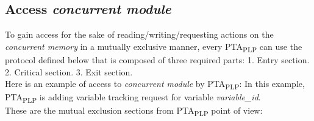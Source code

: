 \subsection{Access \textit{concurrent module}}
To gain access for the sake of reading/writing/requesting actions on the \textit{concurrent memory} in a mutually exclusive manner, every PTA\textsubscript{PLP} can use the protocol defined below that is composed of three required parts: 1. Entry section. 2. Critical section. 3. Exit section.\\
Here is an example of access to \textit{concurrent module} by PTA\textsubscript{PLP}:  In this example, PTA\textsubscript{PLP} is adding variable tracking request for variable \textcolor{ColorEdgeGuard}{\textit{variable_id}}.\\
These are the mutual exclusion sections from PTA\textsubscript{PLP} point of view: 
